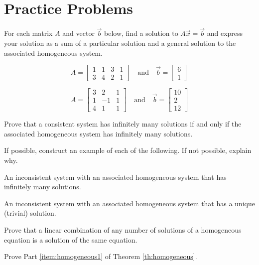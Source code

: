 \documentclass{ximera}
\begin{document}
\section*{Practice Problems}

\begin{problem}
For each matrix $A$ and vector $\vec{b}$ below, find a solution to $A\vec{x}=\vec{b}$ and  express your solution as a sum of a particular solution and a general solution to the associated homogeneous system.

\begin{problem}\label{prob:hompluspart1}
$$A=\begin{bmatrix}1&1&3&1\\3&4&2&1\end{bmatrix}\quad\text{and}\quad\vec{b}=\begin{bmatrix}6\\1\end{bmatrix}$$
\end{problem}

\begin{problem}\label{prob:hompluspart2}
$$A=\begin{bmatrix}3&2&1\\1&-1&1\\4&1&1\end{bmatrix}\quad\text{and}\quad\vec{b}=\begin{bmatrix}10\\2\\12\end{bmatrix}$$
\end{problem}
\end{problem}

\begin{problem}\label{prob:infmanysolutionshom}
Prove that a consistent system has infinitely many solutions if and only if the associated homogeneous system has infinitely many solutions.
\end{problem}

\begin{problem} If possible, construct an example of each of the following.  If not possible, explain why.
  \begin{problem}\label{prob:homexample1}
  An inconsistent system with an associated homogeneous system that has infinitely many solutions.
  \end{problem}
  \begin{problem}\label{prob:homexample2}
  An inconsistent system with an associated homogeneous system that has a unique (trivial) solution.
  \end{problem}
\end{problem}

\begin{problem}\label{prob:lincombsolutions}
Prove that a linear combination of any number of solutions of a homogeneous equation is a solution of the same equation.
\end{problem}

\begin{problem}\label{prob:homogeneouspart1} Prove Part \ref{item:homogeneous1} of Theorem \ref{th:homogeneous}.
\end{problem}
\end{document}

